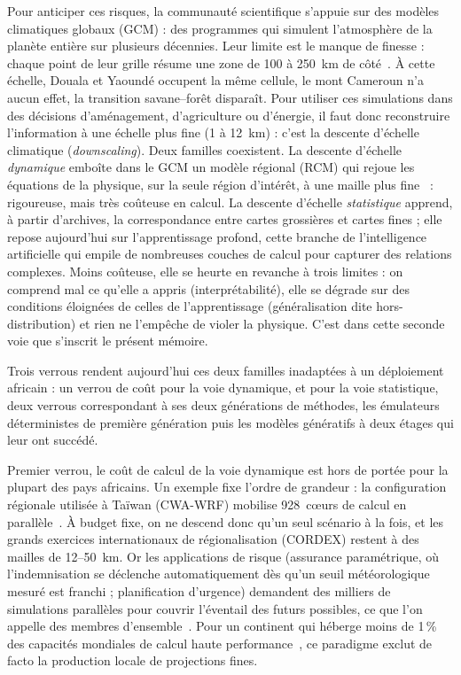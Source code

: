 Pour anticiper ces risques, la communauté scientifique s'appuie sur des modèles climatiques globaux (GCM) : des programmes qui simulent l'atmosphère de la planète entière sur plusieurs décennies. Leur limite est le manque de finesse : chaque point de leur grille résume une zone de 100 à 250~km de côté~\cite{eyring_cmip6_2016}. À cette échelle, Douala et Yaoundé occupent la même cellule, le mont Cameroun n'a aucun effet, la transition savane--forêt disparaît. Pour utiliser ces simulations dans des décisions d'aménagement, d'agriculture ou d'énergie, il faut donc reconstruire l'information à une échelle plus fine (1 à 12~km) : c'est la descente d'échelle climatique (\emph{downscaling}). Deux familles coexistent. La descente d'échelle \emph{dynamique} emboîte dans le GCM un modèle régional (RCM) qui rejoue les équations de la physique, sur la seule région d'intérêt, à une maille plus fine~\cite{maraun_widmann_2018} : rigoureuse, mais très coûteuse en calcul. La descente d'échelle \emph{statistique} apprend, à partir d'archives, la correspondance entre cartes grossières et cartes fines ; elle repose aujourd'hui sur l'apprentissage profond, cette branche de l'intelligence artificielle qui empile de nombreuses couches de calcul pour capturer des relations complexes. Moins coûteuse, elle se heurte en revanche à trois limites : on comprend mal ce qu'elle a appris (interprétabilité), elle se dégrade sur des conditions éloignées de celles de l'apprentissage (généralisation dite hors-distribution) et rien ne l'empêche de violer la physique. C'est dans cette seconde voie que s'inscrit le présent mémoire.

\label{intro:probl}

Trois verrous rendent aujourd'hui ces deux familles inadaptées à un déploiement africain : un verrou de coût pour la voie dynamique, et pour la voie statistique, deux verrous correspondant à ses deux générations de méthodes, les émulateurs déterministes de première génération puis les modèles génératifs à deux étages qui leur ont succédé.

Premier verrou, le coût de calcul de la voie dynamique est hors de portée pour la plupart des pays africains. Un exemple fixe l'ordre de grandeur : la configuration régionale utilisée à Taïwan (CWA-WRF) mobilise 928~cœurs de calcul en parallèle~\cite{mardani_corrdiff_2023}. À budget fixe, on ne descend donc qu'un seul scénario à la fois, et les grands exercices internationaux de régionalisation (CORDEX) restent à des mailles de 12--50~km. Or les applications de risque (assurance paramétrique, où l'indemnisation se déclenche automatiquement dès qu'un seuil météorologique mesuré est franchi ; planification d'urgence) demandent des milliers de simulations parallèles pour couvrir l'éventail des futurs possibles, ce que l'on appelle des membres d'ensemble~\cite{hobeichi_ml_downscaling_2023}. Pour un continent qui héberge moins de 1\,\% des capacités mondiales de calcul haute performance~\cite{bachmann_hpc_africa_2025}, ce paradigme exclut de facto la production locale de projections fines.


